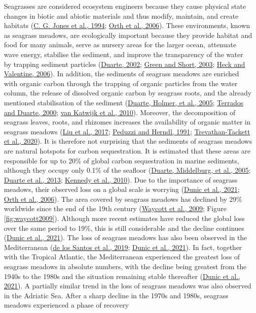\documentclass[
  12 pt,
]{book}
\begin{document}
Seagrasses are considered ecosystem engineers because they cause physical state changes in biotic and abiotic materials and thus modify, maintain, and create habitats (\protect\hyperlink{ref-Jones1994}{C. G. Jones et al., 1994}; \protect\hyperlink{ref-Orth2006}{Orth et al., 2006}). These environments, known as seagrass meadows, are ecologically important because they provide habitat and food for many animals, serve as nursery areas for the larger ocean, attenuate wave energy, stabilise the sediment, and improve the transparency of the water by trapping sediment particles (\protect\hyperlink{ref-Duarte2002}{Duarte, 2002}; \protect\hyperlink{ref-Green2003}{Green and Short, 2003}; \protect\hyperlink{ref-Heck2006}{Heck and Valentine, 2006}). In addition, the sediments of seagrass meadows are enriched with organic carbon through the trapping of organic particles from the water column, the release of dissolved organic carbon by seagrass roots, and the already mentioned stabilisation of the sediment (\protect\hyperlink{ref-Duarte2005}{Duarte, Holmer, et al., 2005}; \protect\hyperlink{ref-Terrados2000}{Terrados and Duarte, 2000}; \protect\hyperlink{ref-vanKatwijk2010}{van Katwijk et al., 2010}). Moreover, the decomposition of seagrass leaves, roots, and rhizomes increases the availability of organic matter in seagrass meadows (\protect\hyperlink{ref-Liu2017}{Liu et al., 2017}; \protect\hyperlink{ref-Peduzzi1991}{Peduzzi and Herndl, 1991}; \protect\hyperlink{ref-Trevathan-Tackett2020}{Trevathan-Tackett et al., 2020}). It is therefore not surprising that the sediments of seagrass meadows are natural hotspots for carbon sequestration. It is estimated that these areas are responsible for up to 20\si{\percent} of global carbon sequestration in marine sediments, although they occupy only 0.1\si{\percent} of the seafloor (\protect\hyperlink{ref-Duarte2005a}{Duarte, Middelburg, et al., 2005}; \protect\hyperlink{ref-Duarte2013}{Duarte et al., 2013}; \protect\hyperlink{ref-Kennedy2010}{Kennedy et al., 2010}). Due to the importance of seagrass meadows, their observed loss on a global scale is worrying (\protect\hyperlink{ref-Dunic2021}{Dunic et al., 2021}; \protect\hyperlink{ref-Orth2006}{Orth et al., 2006}). The area covered by seagrass meadows has declined by 29\si{\percent} worldwide since the end of the 19th century (\protect\hyperlink{ref-Waycott2009}{Waycott et al., 2009}; Figure \ref{fig:waycott2009}). Although more recent estimates have reduced the global loss over the same period to 19\si{\percent}, this is still considerable and the decline continues (\protect\hyperlink{ref-Dunic2021}{Dunic et al., 2021}). The loss of seagrass meadows has also been observed in the Mediterranean (\protect\hyperlink{ref-delosSantos2019}{de los Santos et al., 2019}; \protect\hyperlink{ref-Dunic2021}{Dunic et al., 2021}). In fact, together with the Tropical Atlantic, the Mediterranean experienced the greatest loss of seagrass meadows in absolute numbers, with the decline being greatest from the 1940s to the 1980s and the situation remaining stable thereafter (\protect\hyperlink{ref-Dunic2021}{Dunic et al., 2021}). A partially similar trend in the loss of seagrass meadows was also observed in the Adriatic Sea. After a sharp decline in the 1970s and 1980s, seagrass meadows experienced a phase of recovery 
\end{document}
